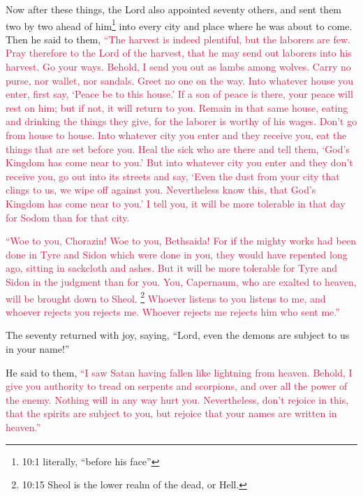 \mychapter{} \myverse*{}Now after these things, the Lord also appointed seventy others,
and sent them two by two ahead of him\footnote{10:1 literally, “before his face”} into every city and place where he was about to come.
\myverse{}Then he said to them,
\textcolor{crimson}{“The harvest is indeed plentiful, but the laborers are few. Pray therefore to the Lord of the harvest,
	that he may send out laborers into his harvest.
}
\myverse{}\textcolor{crimson}{Go your ways. Behold, I send you out as lambs among wolves.
}
\myverse{}\textcolor{crimson}{Carry no purse, nor wallet, nor sandals. Greet no one on the way.
}
\myverse{}\textcolor{crimson}{Into whatever house you enter, first say, ‘Peace be to this house.’
}
\myverse{}\textcolor{crimson}{If a son of peace is there, your peace will rest on him; but if not, it
	will return to you.
}
\myverse{}\textcolor{crimson}{Remain in that same house, eating and drinking the things they give, for
	the laborer is worthy of his wages. Don’t go from house to house.
}
\myverse{}\textcolor{crimson}{Into whatever city you enter and they receive you, eat the things that
	are set before you.
}
\myverse{}\textcolor{crimson}{Heal the sick who are there and tell them, ‘God’s Kingdom has come near
	to you.’
}
\myverse{}\textcolor{crimson}{But into whatever city you enter and they don’t receive you, go out into
	its streets and say,
}
\myverse{}\textcolor{crimson}{‘Even the dust from your city that clings to us, we wipe off against
	you. Nevertheless know this, that God’s Kingdom has come near to you.’
}
\myverse{}\textcolor{crimson}{I tell you, it will be more tolerable in that day for Sodom than for
	that city.}

\myverse{}\textcolor{crimson}{“Woe to you, Chorazin! Woe to you, Bethsaida! For if the
	mighty works had been done in Tyre and Sidon which were done in you, they would have repented long ago,
	sitting in sackcloth and ashes.
}
\myverse{}\textcolor{crimson}{But it will be more tolerable for Tyre and Sidon in the judgment than
	for you.
}
\myverse{}\textcolor{crimson}{You, Capernaum, who are exalted to heaven, will be brought down to Sheol.
}\footnote{10:15 Sheol is the lower realm of the dead, or Hell.}
\myverse{}\textcolor{crimson}{Whoever listens to you listens to me, and whoever rejects you rejects
	me. Whoever rejects me rejects him who sent me.”}

\myverse{}The seventy returned with joy, saying, “Lord, even the demons
are subject to us in your name!”

\myverse{}He said to them,
\textcolor{crimson}{“I saw Satan having fallen like lightning from heaven.
}
\myverse{}\textcolor{crimson}{Behold, I give you authority to tread on serpents and scorpions, and
	over all the power of the enemy. Nothing will in any way hurt you.
}
\myverse{}\textcolor{crimson}{Nevertheless, don’t rejoice in this, that the spirits are subject to
	you, but rejoice that your names are written in heaven.”}

